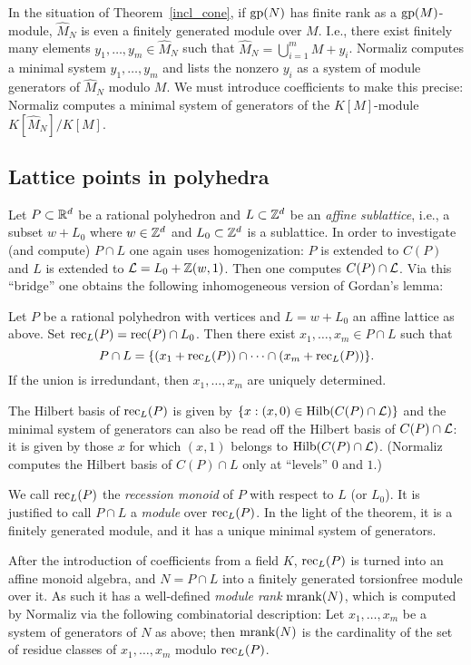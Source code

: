 In the situation of Theorem~\ref{incl_cone}, if $\operatorname{gp}(N)$ has finite rank as a $\operatorname{gp}(M)$-module, $\widehat M_N$ is even a finitely generated module over $M$. I.e., there exist finitely many elements $y_1,\dots,y_m\in \widehat M_N$ such that $\widehat M_N=\bigcup_{i=1}^m M+y_i$. Normaliz computes a minimal system $y_1,\dots,y_m$ and lists the nonzero $y_i$ as a system of module generators of $\widehat M_N$ modulo $M$. We must introduce coefficients to make this precise: Normaliz computes a minimal system of generators of the $K[M]$-module $K[\widehat M_N]/K[M]$.



\subsection{Lattice points in polyhedra}\label{latt_hedra}

Let $P\subset {\mathbb R}^d$ be a rational polyhedron and $L\subset {\mathbb Z}^d$ be an \emph{affine sublattice}, i.e., a subset $w+L_0$ where $w\in{\mathbb Z}^d$ and $L_0\subset {\mathbb Z}^d$ is a sublattice. In order to investigate (and compute) $P\cap L$ one again uses homogenization: $P$ is extended to $C(P)$ and $L$ is extended to ${\mathcal L}=L_0+{\mathbb Z}(w,1)$. Then one computes $C(P)\cap {\mathcal L}$. Via this ``bridge'' one obtains the following inhomogeneous version of Gordan's lemma:

\begin{theorem}
	Let $P$ be a rational polyhedron with vertices and $L=w+L_0$ an affine lattice as above. Set $\operatorname{rec}_L(P)=\operatorname{rec}(P)\cap L_0$. Then there exist $x_1,\dots,x_m\in P\cap L$ such that
	$$
	P\cap L=\{(x_1+\operatorname{rec}_L(P))\cap\dots\cap(x_m+\operatorname{rec}_L(P))\}.
	$$
	If the union is irredundant, then $x_1,\dots,x_m$ are uniquely determined.
\end{theorem}

The Hilbert basis of $\operatorname{rec}_L(P)$ is given by $\{x: (x,0)\in \operatorname{Hilb}(C(P)\cap{\mathcal L})\}$ and the minimal system of generators can also be read off the Hilbert basis of $C(P)\cap {\mathcal L}$: it is given by those $x$ for which $(x,1)$ belongs to $\operatorname{Hilb}(C(P)\cap{\mathcal L})$. (Normaliz computes the Hilbert basis of $C(P)\cap L$ only at ``levels'' $0$ and $1$.)

We call $\operatorname{rec}_L(P)$ the \emph{recession monoid} of $P$ with respect to $L$ (or $L_0$). It is justified to call $P\cap L$ a \emph{module} over $\operatorname{rec}_L(P)$. In the light of the theorem, it is a finitely generated module, and it has a unique minimal system of generators.

After the introduction of coefficients from a field $K$, $\operatorname{rec}_L(P)$ is turned into an affine monoid algebra, and $N=P\cap L$ into a finitely generated torsionfree module over it. As such it has a well-defined \emph{module rank} $\operatorname{mrank}(N)$, which is computed by Normaliz via the following combinatorial description: Let $x_1,\dots,x_m$ be a system of generators of $N$ as above; then $\operatorname{mrank}(N)$ is the cardinality of the set of residue classes of $x_1,\dots,x_m$ modulo $\operatorname{rec}_L(P)$.

